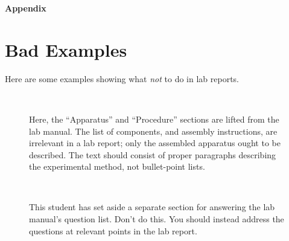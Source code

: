 \documentclass[11pt,a4paper]{article}
\begin{document}
\pagebreak

\begin{center}
  {\LARGE \textbf{Appendix}}
\end{center}

\appendix
\section{Bad Examples}
\label{sec:bad-examples}

Here are some examples showing what \textit{not} to do in lab reports.

\begin{figure}[h]
  \centering
   \\
  \caption{\small Here, the ``Apparatus'' and ``Procedure'' sections
    are lifted from the lab manual.  The list of components, and
    assembly instructions, are irrelevant in a lab report; only the
    assembled apparatus ought to be described.  The text should
    consist of proper paragraphs describing the experimental method,
    not bullet-point lists.}
\end{figure}

\begin{figure}
  \centering
   \\
  \caption{\small This student has set aside a separate section for
    answering the lab manual's question list.  Don't do this.  You
    should instead address the questions at relevant points in the lab
    report.}
\end{figure}
\end{document}
